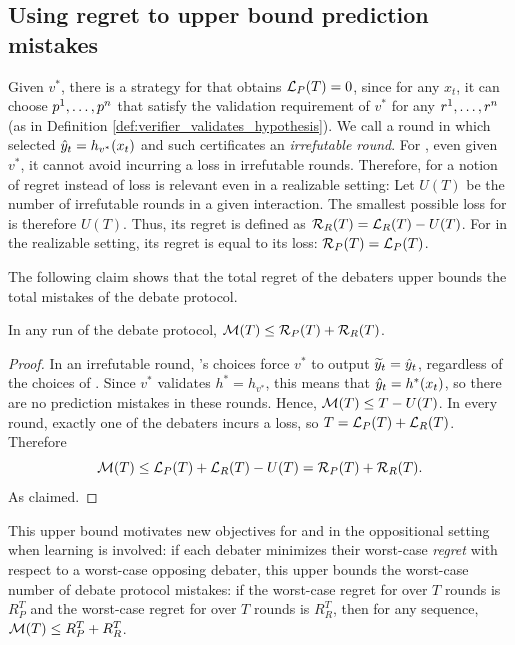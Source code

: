 \documentclass[11pt,letterpaper]{article}
\theoremstyle{definition}
\theoremstyle{plain}
\begin{document}
\subsection{Using regret to upper bound prediction mistakes}

Given $v^*$, there is a strategy for \dt that obtains ${{\mathcal L}_P}(T) = 0$, since for any $x_t$, it can choose ${p}^1,\ldots,{p}^n$ that satisfy the validation requirement of $v^*$ for any ${r}^1,\ldots,{r}^n$ (as in Definition \ref{def:verifier_validates_hypothesis}). We call a round in which \dt selected ${\hat{y}}_t  = h_{v^*}(x_t)$ and such certificates an \emph{irrefutable round}. For \df, even given $v^*$, it cannot avoid incurring a loss in irrefutable rounds. Therefore, for \df a notion of regret instead of loss is relevant even in a realizable setting: Let $U(T)$ be the number of irrefutable rounds in a given interaction. The smallest possible loss for \df is therefore $U(T)$. Thus, its regret is defined as ${{\mathcal R}_R}(T) = {{\mathcal L}_R}(T) - U(T)$. For \dt in the realizable setting, its regret is equal to its loss: 
${{\mathcal R}_P}(T) = {{\mathcal L}_P}(T)$. 


The following claim shows that the total regret of the debaters upper bounds the total mistakes of the debate protocol. 

















\begin{claim}\label{claim:regret}
In any run of the debate protocol,  ${\mathcal M}(T) \leq {{\mathcal R}_P}(T) + {{\mathcal R}_R}(T)$.
\end{claim}
\begin{proof}
In an irrefutable round,  \dt's choices force $v^*$ to output ${\widetilde{y}}_t = {\hat{y}}_t$, regardless of the choices of \df. Since $v^*$ validates $h^* = h_{v^*}$, this means that ${\hat{y}}_t=h^*(x_t)$, so there are no prediction mistakes in these rounds. Hence, ${\mathcal M}(T) \leq T-U(T)$. In every round, exactly one of the debaters incurs a loss, so
$T =  {{\mathcal L}_P}(T)+{{\mathcal L}_R}(T)$. Therefore
\[
{\mathcal M}(T) \leq {{\mathcal L}_P}(T)+{{\mathcal L}_R}(T)-U(T) = {{\mathcal R}_P}(T) + {{\mathcal R}_R}(T).
\]
As claimed.
\end{proof}

This upper bound motivates new objectives for \dt and \df in the oppositional setting when learning is involved: if each debater minimizes their worst-case \emph{regret} with respect to a worst-case opposing debater, this upper bounds the worst-case number of debate protocol mistakes: if the worst-case regret for \dt over $T$ rounds is $R_P^T$ and the worst-case regret for \df  over $T$ rounds is $R_R^T$, then for any sequence, ${\mathcal M}(T) \leq R_P^T+ R_R^T$.
\end{document}
